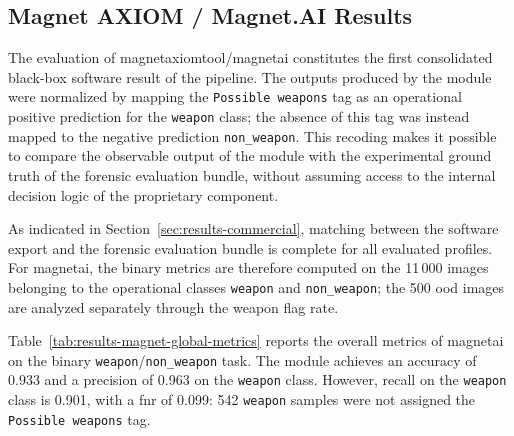 \subsection{Magnet AXIOM / Magnet.AI Results}
\label{subsec:results-magnet}

The evaluation of \gls{magnetaxiomtool}/\gls{magnetai} constitutes the first
consolidated black-box software result of the pipeline. The outputs produced by
the module were normalized by mapping the \texttt{Possible weapons} tag as an
operational positive prediction for the \texttt{weapon} class; the absence of
this tag was instead mapped to the negative prediction
\texttt{non\_weapon}. This recoding makes it possible to compare the observable
output of the module with the experimental ground truth of the forensic
evaluation bundle, without assuming access to the internal decision logic of
the proprietary component.

As indicated in Section~\ref{sec:results-commercial}, matching between the
software export and the forensic evaluation bundle is complete for all
evaluated profiles. For \gls{magnetai}, the binary metrics are therefore
computed on the 11\,000 images belonging to the operational classes
\texttt{weapon} and \texttt{non\_weapon}; the 500 \gls{ood} images are analyzed
separately through the weapon flag rate.

Table~\ref{tab:results-magnet-global-metrics} reports the overall metrics of
\gls{magnetai} on the binary \texttt{weapon}/\texttt{non\_weapon} task. The
module achieves an accuracy of 0.933 and a precision of 0.963 on the
\texttt{weapon} class. However, recall on the \texttt{weapon} class is 0.901,
with a \gls{fnr} of 0.099: 542 \texttt{weapon} samples were not assigned the
\texttt{Possible weapons} tag.

